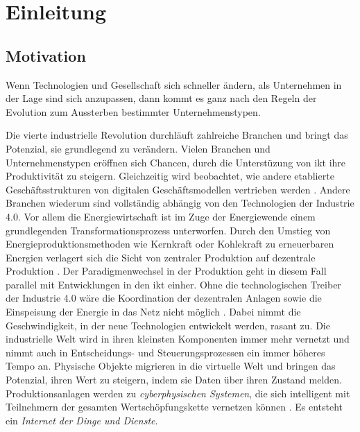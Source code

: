 \section{Einleitung}

\subsection{Motivation}

\begin{displayquote}
  \glqq Wenn Technologien und Gesellschaft sich schneller ändern, als Unternehmen in der Lage sind sich anzupassen, dann kommt es ganz nach den Regeln der Evolution zum Aussterben bestimmter Unternehmenstypen.\grqq{}
\end{displayquote}

\begin{flushright}
  \citet[S. 3, zitiert nach Land, K.-H. 2015]{Roth2016}
\end{flushright}

\noindent Die vierte industrielle Revolution durchläuft zahlreiche Branchen und bringt das Potenzial, sie grundlegend zu verändern. Vielen Branchen und Unternehmenstypen eröffnen sich Chancen, durch die Unterstüzung von \ac{ikt} ihre Produktivität zu steigern. Gleichzeitig wird beobachtet, wie andere etablierte Geschäftsstrukturen von digitalen Geschäftsmodellen vertrieben werden \citep{Lauenroth2016}. Andere Branchen wiederum sind vollständig abhängig von den Technologien der Industrie 4.0. Vor allem die Energiewirtschaft ist im Zuge der Energiewende einem grundlegenden Transformationsprozess unterworfen. Durch den Umstieg von Energieproduktionsmethoden wie Kernkraft oder Kohlekraft zu erneuerbaren Energien verlagert sich die Sicht von zentraler Produktion auf dezentrale Produktion \citep{Doleski2015}. Der Paradigmenwechsel in der Produktion geht in diesem Fall parallel mit Entwicklungen in den \ac{ikt} einher. Ohne die technologischen Treiber der Industrie 4.0 wäre die Koordination der dezentralen Anlagen sowie die Einspeisung der Energie in das Netz nicht möglich \citep{Utecht2018}. Dabei nimmt die Geschwindigkeit, in der neue Technologien entwickelt werden, rasant zu. Die industrielle Welt wird in ihren kleinsten Komponenten immer mehr vernetzt und nimmt auch in Entscheidungs- und Steuerungsprozessen ein immer höheres Tempo an. Physische Objekte migrieren in die virtuelle Welt und bringen das Potenzial, ihren Wert zu steigern, indem sie Daten über ihren Zustand melden. Produktionsanlagen werden zu \textit{cyberphysischen Systemen}, die sich intelligent mit Teilnehmern der gesamten Wertschöpfungskette vernetzen können \citep{Lauenroth2016}. Es entsteht ein \textit{Internet der Dinge und Dienste}. 

